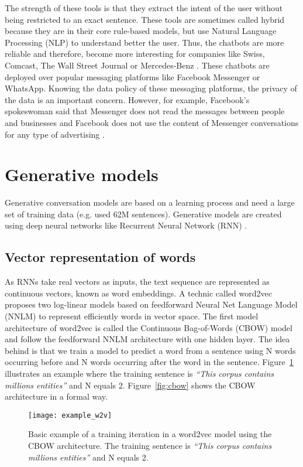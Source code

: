 The strength of these tools is that they extract the intent of the user without being restricted to an exact sentence. These tools are sometimes called hybrid because they are in their core rule-based models, but use Natural Language Processing (NLP) to understand better the user. Thus, the chatbots are more reliable and therefore, become more interesting for companies like Swiss, Comcast, The Wall Street Journal or Mercedes-Benz \citep{dialogflow}. These chatbots are deployed over popular messaging platforms like Facebook Messenger or WhatsApp. Knowing the data policy of these messaging platforms, the privacy of the data is an important concern. However, for example, Facebook's spokeswoman said that Messenger does not read the messages between people and businesses and Facebook does not use the content of Messenger conversations for any type of advertising \citep{facebook-policy}.

\section{Generative models}
Generative conversation models are based on a learning process and need a large set of training data (e.g. \citet{1506.05869} used 62M sentences). Generative models are created using deep neural networks like Recurrent Neural Network (RNN) \citep{1503.02364,1506.05869}.

\subsection{Vector representation of words}

As RNNs take real vectors as inputs, the text sequence are represented as continuous vectors, known as word embeddings. A technic called word2vec \citep{1301.3781} proposes two log-linear models based on feedforward Neural Net Language Model (NNLM) to represent efficiently words in vector space. The first model architecture of word2vec is called the Continuous Bag-of-Words (CBOW) model and follow the feedforward NNLM architecture with one hidden layer.
The idea behind is that we train a model to predict a word from a sentence using N words occurring before and N words occurring after the word in the sentence. Figure~\ref{fig:example_w2v} illustrates an example where the training sentence is \textit{``This corpus contains millions entities''} and N equals 2. Figure~\ref{fig:cbow} shows the CBOW architecture in a formal way.

\begin{figure}
    \centering
    \texttt{[image: example\_w2v]}
    \caption[Word2Vec basic example]{Basic example of a training iteration in a word2vec model using the CBOW architecture. The training sentence is \textit{``This corpus contains millions entities''} and N equals 2.}
    \label{fig:example_w2v}
\end{figure}

